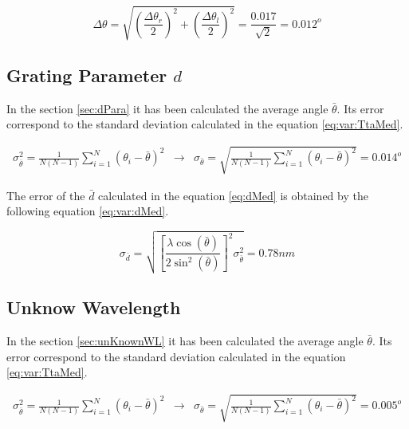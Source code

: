 \documentclass[twoside]{article}
\begin{document}
				\begin{equation}
					\Delta \theta = \sqrt{\left(\frac{\Delta\theta_r}{2}\right)^2 + \left(\frac{\Delta\theta_l}{2}\right)^2} = \frac{0.017} {\sqrt{2}} = 0.012^o
					\label{eq:err:angles}
				\end{equation}

			\subsection{Grating Parameter  \texorpdfstring{$d$}{TEXT}}
				\label{app:dParameter}

				In the section \ref{sec:dPara} it has been calculated the average angle $\bar{\theta}$. Its error correspond to the standard deviation calculated in the equation \ref{eq:var:TtaMed}.

					\begin{equation}
						\begin{matrix}

							\sigma^2_{\bar{\theta}} = \frac{1}{N(N-1)} \sum^N_{i=1} (\theta_i - \bar{\theta})^2 & \rightarrow & \sigma_{\bar{\theta}} = \sqrt{\frac{1}{N(N-1)} \sum^N_{i=1}(\theta_i - \bar{\theta})^2} = 0.014^o
						\end{matrix}
						\label{eq:var:TtaMed}
					\end{equation} 

				The error of the $\bar{d}$ calculated in the equation \ref{eq:dMed} is obtained by the following equation \ref{eq:var:dMed}.

					\begin{equation}
						\sigma_{\bar{d}} = \sqrt{ \left[ \frac{\lambda \cos(\bar{\theta})}{2\sin^2(\bar{\theta})} \right]^2 \sigma^2_{\bar{\theta}}} = 0.78 nm
						\label{eq:var:dMed}
					\end{equation}
	 
			\subsection{Unknow Wavelength}
				\label{app:unKnownWL}

				In the section \ref{sec:unKnownWL} it has been calculated the average angle $\bar{\theta}$. Its error correspond to the standard deviation calculated in the equation \ref{eq:var:TtaMed}.

					\begin{equation}
						\begin{matrix}

							\sigma^2_{\bar{\theta}} = \frac{1}{N(N-1)} \sum^N_{i=1} (\theta_i - \bar{\theta})^2 & \rightarrow & \sigma_{\bar{\theta}} = \sqrt{\frac{1}{N(N-1)} \sum^N_{i=1}(\theta_i - \bar{\theta})^2} = 0.005^o
						\end{matrix}
						\label{eq:var:TtaMed:WL}
					\end{equation} 
\end{document}
